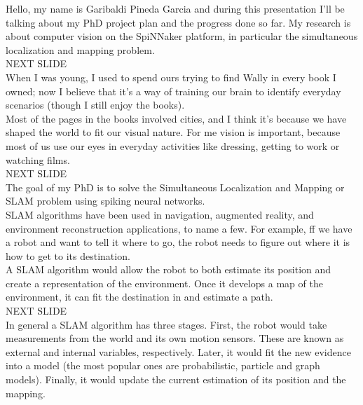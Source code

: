 \documentclass[12t,a4paper]{memoir}
\begin{document}
Hello, my name is Garibaldi Pineda Garcia and during this presentation I'll be 
talking about my PhD project plan and the progress done so far. My research is about computer vision on the SpiNNaker platform, in particular the simultaneous localization and mapping problem. \\

{\Large NEXT SLIDE}\\

When I was young, I used to spend ours trying to find Wally in every book I owned; now I believe that it's a way of training our brain to identify everyday scenarios (though I still enjoy the books).\\

Most of the pages in the books involved cities, and I think it's because we have shaped the world to fit our visual nature. For me vision is important, because most of us use our eyes in everyday activities like dressing, getting to work or watching films.\\

{\Large NEXT SLIDE}\\

The goal of my PhD is to solve the Simultaneous Localization and Mapping or SLAM problem using spiking neural networks. \\

SLAM algorithms have been used in navigation, augmented reality, and environment reconstruction applications, to name a few. For example, ff we have a robot and want to tell it where to go, the robot needs to figure out where it is how to get to its destination.\\

A SLAM algorithm would allow the robot to both estimate its position and create a representation of the environment. Once it develops a map of the environment, it can fit the destination in and estimate a path. \\

{\Large NEXT SLIDE}\\

In general a SLAM algorithm has three stages. First, the robot would take measurements from the world and its own motion sensors. These are known as external and internal variables, respectively. Later, it would fit the new evidence into a model (the most popular ones are probabilistic, particle and graph models). Finally, it would update the current estimation of its position and the mapping. \\
\end{document}
